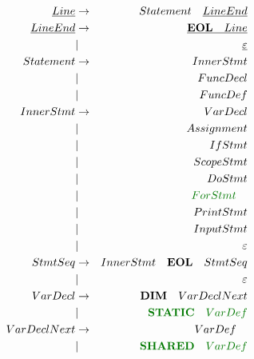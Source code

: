 \documentclass[a4paper,11pt,landscape,leqno]{article}
\begin{document}
\begin{eqnarray}
\underline{Line}        &   \rightarrow     & Statement\quad \underline{LineEnd}    \\
\underline{LineEnd}     & \rightarrow       & \underline{\textbf{EOL}\quad Line}   \\
            &       |           & \underline{\varepsilon}         \\
Statement   &   \rightarrow     & InnerStmt  \\
            &       |           & FuncDecl    \\
            &       |           & FuncDef    \\
InnerStmt   &   \rightarrow     & VarDecl  \\
            &       |           & Assignment    \\
            &       |           & IfStmt    \\
            &       |           & ScopeStmt   \\
            &       |           & DoStmt  \\
            &       |           & \textcolor{green1}{ForStmt}\quad  \\
            &       |           & PrintStmt \\
            &       |           & InputStmt  \\
            &       |           & \varepsilon \\
StmtSeq     &    \rightarrow    & InnerStmt\quad \textbf{EOL}\quad StmtSeq   \\
            &       |           & \varepsilon \\
VarDecl     & \rightarrow       & \textbf{DIM}\quad VarDeclNext \\
            &       |           & \textcolor{green1}{\textbf{STATIC}\quad VarDef} \\
VarDeclNext &   \rightarrow     & VarDef\quad \\
            &       |           & \textcolor{green1}{\textbf{SHARED}\quad VarDef} \\

\end{eqnarray}
\end{document}
